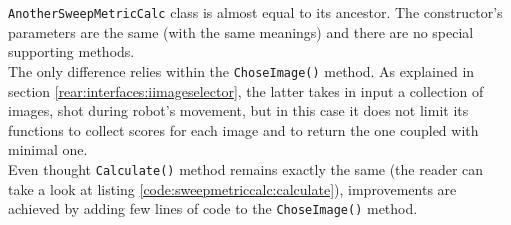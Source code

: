 \texttt{AnotherSweepMetricCalc} class is almost equal to its ancestor. The
constructor's parameters are the same (with the same meanings)
and there are no special supporting methods.
\\
The only difference relies within the \texttt{ChoseImage()} method. As
explained in section \ref{rear:interfaces:iimageselector}, the latter
takes in input a collection of images, shot during robot's movement,
but in this case it does not limit its functions to collect scores
for each image and to return the one coupled with minimal one. 
\\
Even thought \texttt{Calculate()} method remains exactly the same
(the reader can take a look at listing
\ref{code:sweepmetriccalc:calculate}), improvements are
achieved by adding few lines of code to the \texttt{ChoseImage()}
method.
\\
